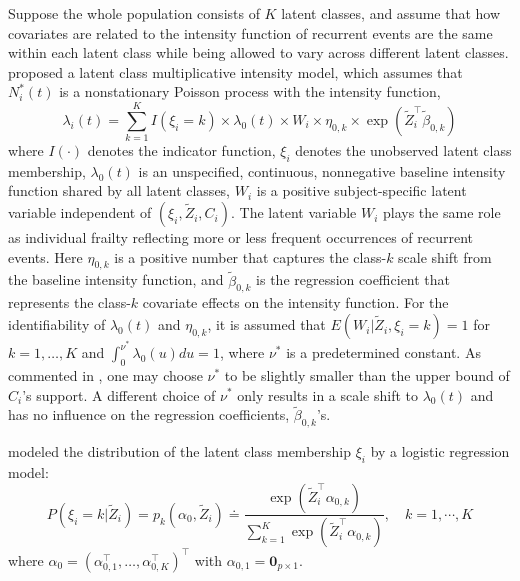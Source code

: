 Suppose the whole population consists of \(K\) latent classes, and assume that how covariates are related to the intensity function of recurrent events are the same within each latent class while being allowed to vary across different latent classes. \citet{zhao2022semiparametric} proposed a latent class multiplicative intensity model, which assumes that \(N_i^*(t)\) is a nonstationary Poisson process with the intensity function,
\begin{equation} 
\label{eq:1}
\lambda _{i} (t) = \sum _{k = 1} ^{K} I (\xi _{i} = k) \times \lambda _{0} (t) \times W_{i} \times \eta _{0,k} \times \exp(\tilde{Z} _{i} ^{\top} \tilde{\beta} _{0,k}) 
\end{equation}
where \(I(\cdot)\) denotes the indicator function, \(\xi_i\) denotes the unobserved latent class membership, \(\lambda _{0} (t)\) is an unspecified, continuous, nonnegative baseline intensity function shared by all latent classes, \(W_{i}\) is a positive subject-specific latent variable independent of \((\xi_i, \tilde{Z}_i, C_i)\). The latent variable \(W_i\) plays the same role as individual frailty reflecting more or less frequent occurrences of recurrent events. Here \(\eta _{0,k}\) is a positive number that captures the class-\(k\) scale shift from the baseline intensity function, and \(\tilde{\beta} _{0,k}\) is the regression coefficient that represents the class-\(k\) covariate effects on the intensity function. For the identifiability of \(\lambda_{0}(t)\) and \(\eta _{0,k}\), it is assumed that \(E(W_{i} | \tilde {Z} _{i} , \xi _{i} = k) = 1\) for \(k = 1, \dots, K\) and \(\int _{0}^{\nu^{*}} \lambda_{0} (u) du = 1\), where \(\nu^{*}\) is a predetermined constant. As commented in \citet{zhao2022semiparametric}, one may choose \(\nu^{*}\) to be slightly smaller than the upper bound of \(C_i\)'s support. A different choice of \(\nu^{*}\) only results in a scale shift to \(\lambda_{0}(t)\) and has no influence on the regression coefficients, \(\tilde{\beta} _{0,k}\)'s.

\citet{zhao2022semiparametric} modeled the distribution of the latent class membership \(\xi_i\) by a
logistic regression model:
\begin{equation} 
\label{eq:2}
P(\xi _{i} = k | \tilde{Z} _{i}) = p_{k} (\alpha _{0} , \tilde{Z} _{i}) \doteq \frac{\exp(\tilde{Z} _{i} ^{\top} \alpha _{0,k})}{\sum_{k = 1}^{K}\exp(\tilde{Z} _{i} ^{\top} \alpha _{0,k}) } , \quad k = 1, \cdots, K 
\end{equation}
where \(\alpha_0=(\alpha_{0,1}^\top,\ldots, \alpha_{0, K}^\top)^\top\) with \(\alpha_{0,1} = \textbf{0}_{p\times 1}\).

